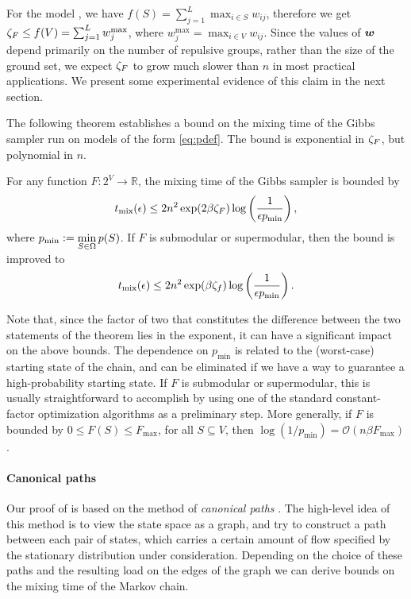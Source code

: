 For the \flid{} model , we have $f(S) = \sum_{j=1}^L \max_{i \in S} w_{ij}$, therefore we get $\zeta_F \leq f(V) = \sum_{j=1}^L w_j^{\mathrm{max}}$, where $w_j^{\mathrm{max}} = \max_{i \in V} w_{ij}$.
Since the values of $\bm{w}$ depend primarily on the number of repulsive groups, rather than the size of the ground set, we expect $\zeta_F$ to grow much slower than $n$ in most practical applications.
We present some experimental evidence of this claim in the next section. \todo{}

\vspace{1.5em}
\noindent The following theorem establishes a bound on the mixing time of the Gibbs sampler run on models of the form \eqref{eq:pdef}.
The bound is exponential in $\zeta_F$, but polynomial in $n$.
\begin{theorem} \label{thm:poly}
  For any function $F : 2^V \to \mathbb{R}$, the mixing time of the Gibbs sampler is bounded by
  \begin{align*}
    t_{\mathrm{mix}}(\epsilon) \leq 2n^2 \exp(2 \beta \zeta_F) \log\left(\frac{1}{\epsilon p_{\min}}\right),
  \end{align*}
  where $p_{\min} \vcentcolon= \displaystyle\min_{S \in \Omega}p(S)$.
  If $F$ is submodular or supermodular, then the bound is improved to
  \begin{align*}
    t_{\mathrm{mix}}(\epsilon) \leq 2n^2 \exp(\beta \zeta_f) \log\left(\frac{1}{\epsilon p_{\min}}\right).
  \end{align*}
\end{theorem}
Note that, since the factor of two that constitutes the difference between the two statements of the theorem lies in the exponent, it can have a significant impact on the above bounds.
The dependence on $p_{\min}$ is related to the (worst-case) starting state of the chain, and can be eliminated if we have a way to guarantee a high-probability starting state.
If $F$ is submodular or supermodular, this is usually straightforward to accomplish by using one of the standard constant-factor optimization algorithms \citep{nemhauser78,fujishige05} as a preliminary step.
More generally, if $F$ is bounded by $0 \leq F(S) \leq F_{\max}$, for all $S \subseteq V$, then $\log (1/p_{\min}) = \mathcal{O}(n \beta F_{\max})$.

\paragraph{Canonical paths}
Our proof of  is based on the method of \emph{canonical paths} \citep{jerrum03,sinclair92,jerrum89,diaconis91}.
The high-level idea of this method is to view the state space as a graph, and try to construct a path between each pair of states, which carries a certain amount of flow specified by the stationary distribution under consideration.
Depending on the choice of these paths and the resulting load on the edges of the graph we can derive bounds on the mixing time of the Markov chain.

